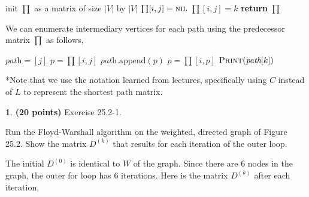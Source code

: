 \documentclass[11pt]{article}
\theoremstyle{definition}
\theoremstyle{theorem}
\newtheorem{prob}{}
\newcommand{\solution}{\medskip\noindent{\color{DarkBlue}\textbf{Solution:}}}
\begin{document}
\begin{algorithmic}[1]
	\State init $\prod$ as a matrix of size $|V|$ by $|V|$
				\State $\prod[i, j] = \textproc{\textsc{nil}}$
			\Else
            					\State $\prod[i, j] = k$
            				\EndIf
            			\EndFor
			\EndIf
		\EndFor
	\EndFor
	\State \textbf{return} $\prod$
\EndFunction
\end{algorithmic}

We can enumerate intermediary vertices for each path using the predecessor matrix $\prod$ as follows,
\begin{algorithmic}[1]
			\State $\textit{path} = [j]$ 
			\State $p = \prod[i, j]$ 
				\State $\textit{path}.\text{append}(p)$
				\State $p = \prod[i, p]$
			\EndWhile 
			 
				\State $\textproc{\textsc{Print}}(\textit{path}[k])$
			\EndFor
		\EndFor
	\EndFor
\EndFunction
\end{algorithmic}

*Note that we use the notation learned from lectures, specifically using $C$ instead of $L$ to represent the shortest path matrix. 


\newpage
\begin{prob} \textbf{(20 points)} Exercise 25.2-1.
\end{prob}

Run the Floyd-Warshall algorithm on the weighted, directed graph of Figure 25.2. Show the matrix $D^{(k)}$ that results for each iteration of the outer loop.

\solution

The initial $D^{(0)}$ is identical to $W$ of the graph. Since there are 6 nodes in the graph, the outer for loop has 6 iterations. Here is the matrix $D^{(k)}$ after each iteration,
\end{document}
